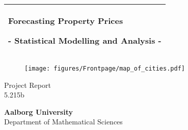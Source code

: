 %
\begin{titlepage}
  \addtolength{\hoffset}{0.5\evensidemargin-0.5\oddsidemargin} %
  \noindent%
  \begin{tabular}{@{}p{\textwidth}@{}}
    \toprule[2pt]
    \midrule
    \vspace{0.2cm}
    \begin{center}
    \Huge{\textbf{
      Forecasting Property Prices%
    }}
    \end{center}
    \begin{center}
      \Large{
        - Statistical Modelling and Analysis -%
      }
    \end{center}
    \vspace{0.2cm}\\
    \midrule
    \toprule[2pt]
  \end{tabular}
  \begin{figure}[H]
      \centering
      \texttt{[image: figures/Frontpage/map\_of\_cities.pdf]}
  \end{figure}
  \vspace{0.5 mm}
  \begin{center}
    {\large
      Project Report%
    }\\
    \vspace{0.2cm}
    {\Large
      5.215b%
    }
  \end{center}
  \vfill
  \begin{center}
  {\Large \textbf{Aalborg University}}\\ \vspace{5pt}
  Department of Mathematical Sciences
  \end{center}
\end{titlepage}
\clearpage